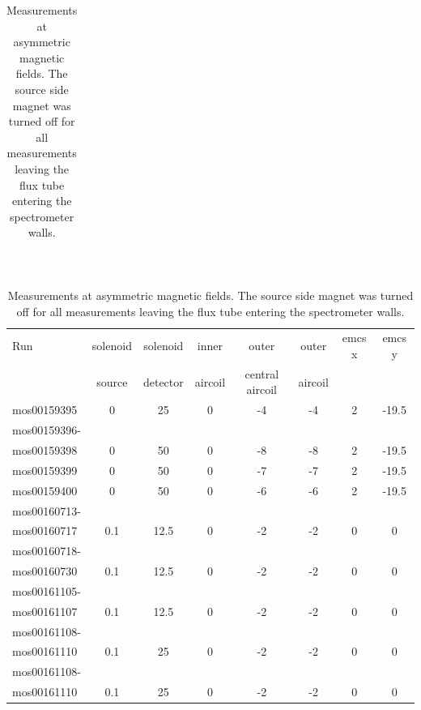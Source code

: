   \begin{table}[b!]
	\centering
		\begin{tabular}{c}
		\end{tabular}\\
		\begin{tabular}{|l|ccccccc|}
			\hline
			\centering
			
			Run &  solenoid &solenoid &inner & outer &outer &emcs x	&emcs y\\
			& source	& detector & aircoil & central aircoil & aircoil& &\\
			\hline
			mos00159395& 0&	25&	0&	-4&	-4&	2&	-19.5\\
			\hline
			mos00159396-&&&&&&&\\
			mos00159398 & 0 & 50& 0 & -8 & -8 & 2 & -19.5\\
			\hline
			mos00159399 & 0 & 50& 0 & -7 & -7 & 2 & -19.5\\
			\hline
			mos00159400 & 0 & 50& 0 & -6 & -6 & 2 & -19.5\\
			\hline
			mos00160713-&&&&&&&\\
			mos00160717& 0.1 & 12.5 & 0 & -2 & -2 & 0 & 0\\
			\hline
			mos00160718-&&&&&&&\\
			mos00160730 & 0.1 & 12.5 & 0 & -2 & -2 & 0 & 0\\
			\hline
			mos00161105-&&&&&&&\\
			mos00161107 & 0.1 & 12.5 & 0 & -2 & -2 & 0 & 0\\
			\hline
			mos00161108-&&&&&&&\\
			mos00161110 & 0.1 & 25 & 0 & -2 & -2 & 0 & 0\\
			\hline
			mos00161108-&&&&&&&\\
			mos00161110 & 0.1 & 25 & 0 & -2 & -2 & 0 & 0\\
			\hline
		\end{tabular}
		\caption[Asymmetric magnetic field measurements]{Measurements at asymmetric magnetic fields. The source side magnet was turned off for all measurements leaving the flux tube entering the spectrometer walls.}
		\label{tab:analysis:asymmetricMagneticFields}
	\end{table}
	
